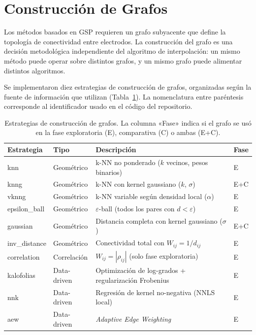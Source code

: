 \section{Construcción de Grafos}
\label{sec:graph_construction_methods}

Los métodos basados en GSP requieren un grafo subyacente que define la topología de conectividad entre electrodos. La construcción del grafo es una decisión metodológica independiente del algoritmo de interpolación: un mismo método puede operar sobre distintos grafos, y un mismo grafo puede alimentar distintos algoritmos.

Se implementaron diez estrategias de construcción de grafos, organizadas según la fuente de información que utilizan (Tabla~\ref{tab:graph_methods}). La nomenclatura entre paréntesis corresponde al identificador usado en el código del repositorio.

\begin{table}[htbp]
\centering
\caption{Estrategias de construcción de grafos. La columna «Fase» indica si el grafo se usó en la fase exploratoria (E), comparativa (C) o ambas (E+C).}
\label{tab:graph_methods}
\small
\begin{tabular}{@{}llp{4.8cm}l@{}}
\toprule
Estrategia & Tipo & Descripción & Fase \\
\midrule
knn & Geométrico & k-NN no ponderado ($k$ vecinos, pesos binarios) & E \\
knng & Geométrico & k-NN con kernel gaussiano ($k$, $\sigma$) & E+C \\
vknng & Geométrico & k-NN variable según densidad local ($\alpha$) & E \\
epsilon\_ball & Geométrico & $\varepsilon$-ball (todos los pares con $d<\varepsilon$) & E \\
gaussian & Geométrico & Distancia completa con kernel gaussiano ($\sigma$) & E+C \\
inv\_distance & Geométrico & Conectividad total con $W_{ij}=1/d_{ij}$ & E \\
correlation & Correlación & $W_{ij}=|\rho_{ij}|$ (solo fase exploratoria) & E \\
kalofolias & Data-driven & Optimización de log-grados + regularización Frobenius & E \\
nnk & Data-driven & Regresión de kernel no-negativa (NNLS local) & E \\
aew & Data-driven & \textit{Adaptive Edge Weighting} & E \\
\bottomrule
\end{tabular}
\end{table}

